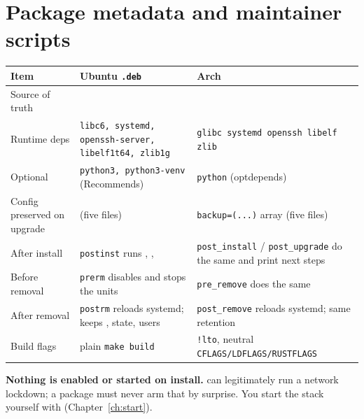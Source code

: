 \section{Package metadata and maintainer scripts}
\begin{center}\small
\begin{tabularx}{\textwidth}{@{}L{3.1cm}L{3.2cm}Y@{}}
\toprule
\textbf{Item} & \textbf{Ubuntu \texttt{.deb}} & \textbf{Arch}\\
\midrule
Source of truth &  & \\
Runtime deps & \texttt{libc6, systemd, openssh-server, libelf1t64, zlib1g} & \texttt{glibc systemd openssh libelf zlib}\\
Optional & \texttt{python3, python3-venv} (Recommends) & \texttt{python} (optdepends)\\
Config preserved on upgrade &  (five files) & \texttt{backup=(...)} array (five files)\\
After install & \texttt{postinst} runs , ,  &  \texttt{post\_install} / \texttt{post\_upgrade} do the same and print next steps\\
Before removal & \texttt{prerm} disables and stops the units & \texttt{pre\_remove} does the same\\
After removal & \texttt{postrm} reloads systemd; keeps , state, users & \texttt{post\_remove} reloads systemd; same retention\\
Build flags & plain \texttt{make build} & \texttt{!lto}, neutral \texttt{CFLAGS/LDFLAGS/RUSTFLAGS}\\
\bottomrule
\end{tabularx}
\end{center}
\textbf{Nothing is enabled or started on install.}  can legitimately run a network lockdown;
a package must never arm that by surprise. You start the stack yourself with 
(Chapter~\ref{ch:start}).

